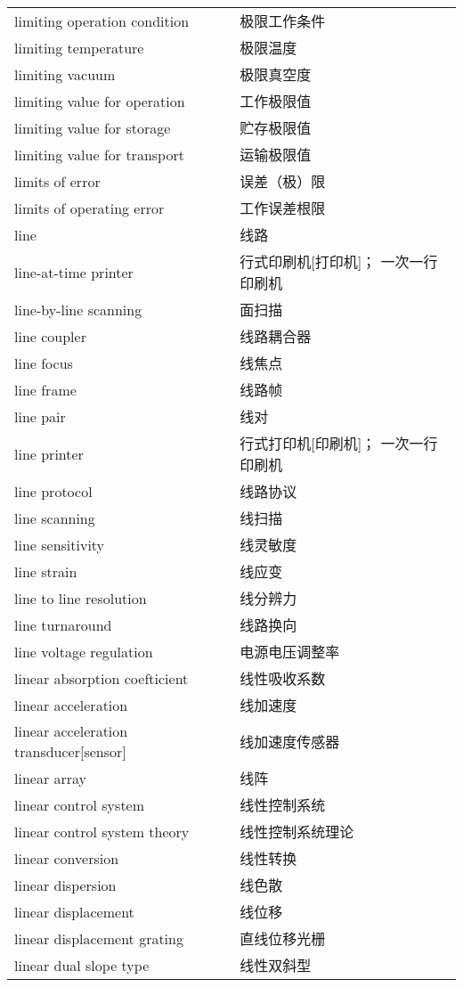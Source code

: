\documentclass[
]{article}
\begin{document}
\begin{longtable}[]{@{}ll@{}}
limiting operation condition & 极限工作条件 \\
limiting temperature & 极限温度 \\
limiting vacuum & 极限真空度 \\
limiting value for operation & 工作极限值 \\
limiting value for storage & 贮存极限值 \\
limiting value for transport & 运输极限值 \\
limits of error & 误差（极）限 \\
limits of operating error & 工作误差根限 \\
line & 线路 \\
line-at-time printer & 行式印刷机{[}打印机{]}； 一次一行印刷机 \\
line-by-line scanning & 面扫描 \\
line coupler & 线路耦合器 \\
line focus & 线焦点 \\
line frame & 线路帧 \\
line pair & 线对 \\
line printer & 行式打印机{[}印刷机{]}； 一次一行印刷机 \\
line protocol & 线路协议 \\
line scanning & 线扫描 \\
line sensitivity & 线灵敏度 \\
line strain & 线应变 \\
line to line resolution & 线分辨力 \\
line turnaround & 线路换向 \\
line voltage regulation & 电源电压调整率 \\
linear absorption coefticient & 线性吸收系数 \\
linear acceleration & 线加速度 \\
linear acceleration transducer{[}sensor{]} & 线加速度传感器 \\
linear array & 线阵 \\
linear control system & 线性控制系统 \\
linear control system theory & 线性控制系统理论 \\
linear conversion & 线性转换 \\
linear dispersion & 线色散 \\
linear displacement & 线位移 \\
linear displacement grating & 直线位移光栅 \\
linear dual slope type & 线性双斜型 \\

\end{longtable}
\end{document}
